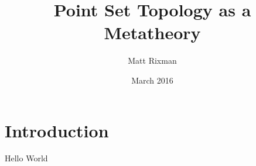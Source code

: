\documentclass{article}
\title{Point Set Topology as a Metatheory}
\author{Matt Rixman }
\date{March 2016}
\begin{document}
\maketitle

\section{Introduction}

Hello World
\end{document}

